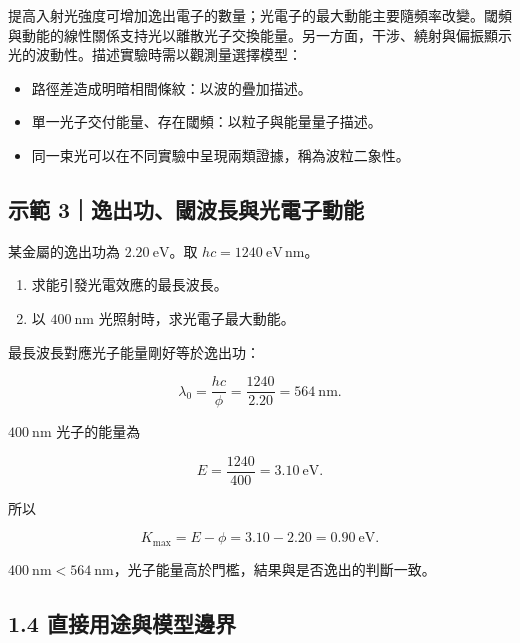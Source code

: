 \documentclass[11pt,a4paper]{article}
\providecommand{\tightlist}{%
  \setlength{\itemsep}{0pt}\setlength{\parskip}{0pt}}
\begin{document}
提高入射光強度可增加逸出電子的數量；光電子的最大動能主要隨頻率改變。閾頻與動能的線性關係支持光以離散光子交換能量。另一方面，干涉、繞射與偏振顯示光的波動性。描述實驗時需以觀測量選擇模型：

\begin{itemize}
\tightlist
\item
  路徑差造成明暗相間條紋：以波的疊加描述。
\item
  單一光子交付能量、存在閾頻：以粒子與能量量子描述。
\item
  同一束光可以在不同實驗中呈現兩類證據，稱為波粒二象性。
\end{itemize}

\begin{HandoutWorkedExample}

\subsection{示範 3｜逸出功、閾波長與光電子動能}\label{ux793aux7bc4-3ux9038ux51faux529fux95beux6ce2ux9577ux8207ux5149ux96fbux5b50ux52d5ux80fd}

某金屬的逸出功為 \(2.20\ \mathrm{eV}\)。取 \(hc=1240\ \mathrm{eV\,nm}\)。

\begin{enumerate}
\def\labelenumi{\arabic{enumi}.}
\tightlist
\item
  求能引發光電效應的最長波長。
\item
  以 \(400\ \mathrm{nm}\) 光照射時，求光電子最大動能。
\end{enumerate}

最長波長對應光子能量剛好等於逸出功：

\[
\lambda_0=\frac{hc}{\phi}
=\frac{1240}{2.20}
=564\ \mathrm{nm}.
\]

\(400\ \mathrm{nm}\) 光子的能量為

\[
E=\frac{1240}{400}=3.10\ \mathrm{eV}.
\]

所以

\[
K_{\max}=E-\phi=3.10-2.20=0.90\ \mathrm{eV}.
\]

\(400\ \mathrm{nm}<564\ \mathrm{nm}\)，光子能量高於門檻，結果與是否逸出的判斷一致。

\end{HandoutWorkedExample}

\subsection{1.4 直接用途與模型邊界}\label{ux76f4ux63a5ux7528ux9014ux8207ux6a21ux578bux908aux754c}
\end{document}
